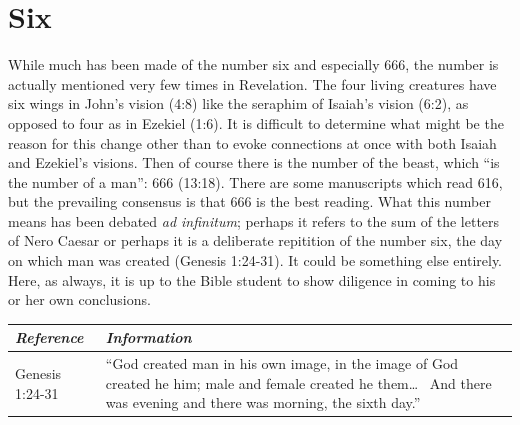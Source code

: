 \section*{Six}
While much has been made of the number six and especially 666, the number is actually mentioned very few times in Revelation. The four living creatures have six wings in John's vision (4:8) like the seraphim of Isaiah's vision (6:2), as opposed to four as in Ezekiel (1:6). It is difficult to determine what might be the reason for this change other than to evoke connections at once with both Isaiah and Ezekiel's visions.
\newline\newline
Then of course there is the number of the beast, which ``is the number of a man'': 666 (13:18). There are some manuscripts which read 616, but the prevailing consensus is that 666 is the best reading. What this number means has been debated \textit{ad infinitum}; perhaps it refers to the sum of the letters of Nero Caesar or perhaps it is a deliberate repitition of the number six, the day on which man was created (Genesis 1:24-31). It could be something else entirely. Here, as always, it is up to the Bible student to show diligence in coming to his or her own conclusions.
\newline\newline
\begin{tabularx}{\textwidth}{l X}
\toprule
\rowcolor{headergray}\emph{Reference} & \emph{Information}\\ 
\midrule
Genesis 1:24-31 & ``God created man in his own image, in the image of God created he him; male and female created he them\ldots~ And there was evening and there was morning, the sixth day.'' \\
\bottomrule
\end{tabularx}

